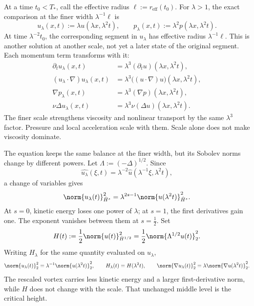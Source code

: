 
At a time \(t_0<T_*\), call the effective radius \(\ell:=r_{\mathrm{eff}}(t_0)\).
For \(\lambda>1\), the exact \NavierStokes{} comparison at the finer width \(\lambda^{-1}\ell\) is
\[
  u_\lambda(x,t)
  :=
  \lambda u(\lambda x,\lambda^2t),
  \qquad
  p_\lambda(x,t)
  :=
  \lambda^2p(\lambda x,\lambda^2t).
\]
At time \(\lambda^{-2}t_0\), the corresponding segment in \(u_\lambda\) has effective radius \(\lambda^{-1}\ell\).
This is another solution at another scale, not yet a later state of the original segment.
Each momentum term transforms with it:
\[
\begin{aligned}
  \partial_tu_\lambda(x,t)
  &=
  \lambda^3(\partial_tu)(\lambda x,\lambda^2t),
  \\
  (u_\lambda\cdot\nabla)u_\lambda(x,t)
  &=
  \lambda^3\bigl((u\cdot\nabla)u\bigr)(\lambda x,\lambda^2t),
  \\
  \nabla p_\lambda(x,t)
  &=
  \lambda^3(\nabla p)(\lambda x,\lambda^2t),
  \\
  \nu\Delta u_\lambda(x,t)
  &=
  \lambda^3\nu(\Delta u)(\lambda x,\lambda^2t).
\end{aligned}
\]
The finer scale strengthens viscosity and nonlinear transport by the same \(\lambda^3\) factor.
Pressure and local acceleration scale with them.
Scale alone does not make viscosity dominate.


The equation keeps the same balance at the finer width, but its Sobolev norms change by different powers.
Let \(\Lambda:=(-\Delta)^{1/2}\).
Since
\[
  \widehat{u_\lambda}(\xi,t)
  =
  \lambda^{-2}\widehat u(\lambda^{-1}\xi,\lambda^2t),
\]
a change of variables gives
\[
  \norm{u_\lambda(t)}_{\dot H^s}^2
  =
  \lambda^{2s-1}
  \norm{u(\lambda^2t)}_{\dot H^s}^2.
\]
At \(s=0\), kinetic energy loses one power of \(\lambda\); at \(s=1\), the first derivatives gain one.
The exponent vanishes between them at \(s=\tfrac12\).
Set
\[
  H(t)
  :=
  \frac12\norm{u(t)}_{\dot H^{1/2}}^2
  =
  \frac12\norm{\Lambda^{1/2}u(t)}_2^2.
\]
Writing \(H_\lambda\) for the same quantity evaluated on \(u_\lambda\),
\[
  \norm{u_\lambda(t)}_2^2
  =
  \lambda^{-1}\norm{u(\lambda^2t)}_2^2,
  \qquad
  H_\lambda(t)=H(\lambda^2t),
  \qquad
  \norm{\nabla u_\lambda(t)}_2^2
  =
  \lambda\norm{\nabla u(\lambda^2t)}_2^2.
\]
The rescaled vortex carries less kinetic energy and a larger first-derivative norm, while \(H\) does not change with the scale.
That unchanged middle level is the critical height.

